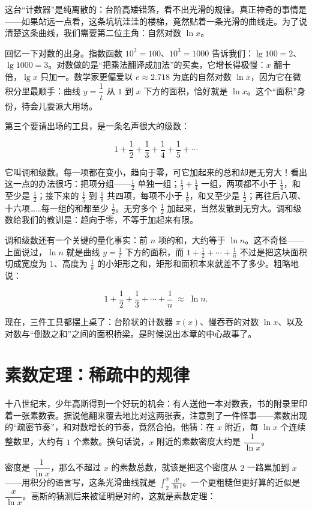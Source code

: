 这台“计数器”是纯离散的：台阶高矮错落，看不出光滑的规律。真正神奇的事情是——如果站远一点看，这条坑坑洼洼的楼梯，竟然贴着一条光滑的曲线走。为了说清楚这条曲线，我们需要第二位主角：自然对数 $\ln x$。

回忆一下对数的出身。指数函数 $10^{2}=100$、$10^{3}=1000$ 告诉我们：$\lg 100=2$、$\lg 1000=3$。对数做的是“把乘法翻译成加法”的买卖，它增长得极慢：$x$ 翻十倍，$\lg x$ 只加一。数学家更偏爱以 $e\approx2.718$ 为底的自然对数 $\ln x$，因为它在微积分里最顺手：曲线 $y=\dfrac{1}{t}$ 从 $1$ 到 $x$ 下方的面积，恰好就是 $\ln x$。这个“面积”身份，待会儿要派大用场。

第三个要请出场的工具，是一条名声很大的级数：

\[
1+\frac12+\frac13+\frac14+\frac15+\cdots
\]

它叫调和级数。每一项都在变小，趋向于零，可它加起来的总和却是无穷大！看出这一点的办法很巧：把项分组——$\frac12$ 单独一组；$\frac13+\frac14$ 一组，两项都不小于 $\frac14$，和至少是 $\frac12$；接下来的 $\frac15$ 到 $\frac18$ 共四项，每项不小于 $\frac18$，和又至少是 $\frac12$；再往后八项、十六项……每一组的和都至少 $\frac12$。无穷多个 $\frac12$ 加起来，当然发散到无穷大。调和级数给我们的教训是：趋向于零，不等于加起来有限。

调和级数还有一个关键的量化事实：前 $n$ 项的和，大约等于 $\ln n$。这不奇怪——上面说过，$\ln n$ 就是曲线 $y=\frac1t$ 下方的面积，而 $1+\frac12+\cdots+\frac1n$ 不过是把这块面积切成宽度为 $1$、高度为 $\frac1k$ 的小矩形之和，矩形和面积本来就差不了多少。粗略地说：

\[
1+\frac12+\frac13+\cdots+\frac1n \;\approx\; \ln n.
\]

现在，三件工具都摆上桌了：台阶状的计数器 $\pi(x)$、慢吞吞的对数 $\ln x$、以及对数与“倒数之和”之间的面积桥梁。是时候说出本章的中心故事了。

\section{素数定理：稀疏中的规律}

十八世纪末，少年高斯得到一个好玩的机会：有人送他一本对数表，书的附录里印着一张素数表。据说他翻来覆去地比对这两张表，注意到了一件怪事——素数出现的“疏密节奏”，和对数增长的节奏，竟然合拍。他猜：在 $x$ 附近，每 $\ln x$ 个连续整数里，大约有 $1$ 个素数。换句话说，$x$ 附近的素数密度大约是 $\dfrac{1}{\ln x}$。

密度是 $\dfrac{1}{\ln x}$，那么不超过 $x$ 的素数总数，就该是把这个密度从 $2$ 一路累加到 $x$——用积分的语言写，这条光滑曲线就是 $\displaystyle\int_2^x \frac{\mathrm{d}t}{\ln t}$。一个更粗糙但更好算的近似是 $\dfrac{x}{\ln x}$。高斯的猜测后来被证明是对的，这就是素数定理：

